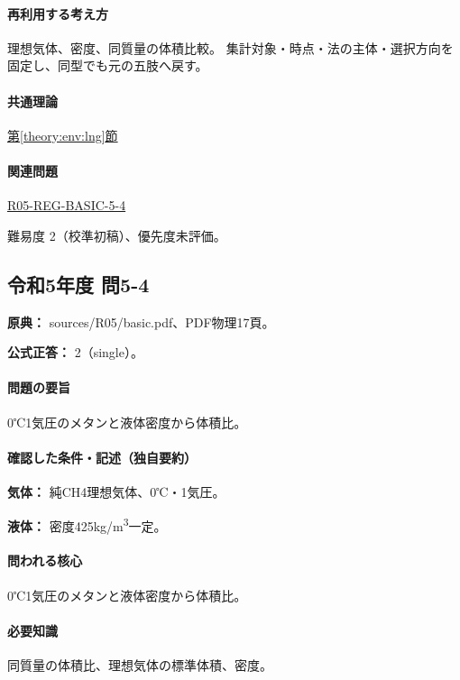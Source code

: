 \paragraph{再利用する考え方} 理想気体、密度、同質量の体積比較。 集計対象・時点・法の主体・選択方向を固定し、同型でも元の五肢へ戻す。

\paragraph{共通理論} \hyperref[theory:env:lng]{第\ref*{theory:env:lng}節}

\paragraph{関連問題} \hyperref[q:r05-reg-basic-5-4]{R05-REG-BASIC-5-4}

\par 難易度 2（校準初稿）、優先度未評価。

\subsection{令和5年度 問5-4}
\label{q:r05-reg-basic-5-4}

\noindent\textbf{原典：} sources/R05/basic.pdf、PDF物理17頁。

\textbf{公式正答：} 2（single）。

\paragraph{問題の要旨} 0℃1気圧のメタンと液体密度から体積比。

\paragraph{確認した条件・記述（独自要約）}\mbox{}\par

\noindent\textbf{気体：} 純CH4理想気体、0℃・1気圧。\par

\noindent\textbf{液体：} 密度425kg/m\textsuperscript{3}一定。\par

\paragraph{問われる核心} 0℃1気圧のメタンと液体密度から体積比。

\paragraph{必要知識} 同質量の体積比、理想気体の標準体積、密度。

